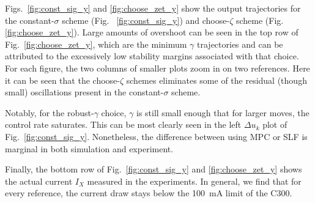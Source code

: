 \documentclass[twocolumn,twoside]{IEEEtran}
\begin{document}
Figs.~\ref{fig:const_sig_y} and \ref{fig:choose_zet_y} show the output trajectories for the constant-$\sigma$ scheme (Fig. ~\ref{fig:const_sig_y}) and choose-$\zeta$ scheme (Fig. \ref{fig:choose_zet_y}). Large amounts of overshoot can be seen in the top row of Fig.~\ref{fig:choose_zet_y}, which are the minimum $\gamma$ trajectories and can be attributed to the excessively low stability margins associated with that choice. For each figure, the two columns of smaller plots zoom in on two references. Here it can be seen that the choose-$\zeta$ schemes eliminates some of the residual (though small) oscillations present in the constant-$\sigma$ scheme.


Notably, for the robust-$\gamma$ choice, $\gamma$ is still small enough that for larger moves, the control rate saturates. This can be most clearly seen in the left $\Delta u_k$ plot of Fig.~\ref{fig:const_sig_y}. Nonetheless, the difference between using MPC or SLF is marginal in both simulation and experiment. 



Finally, the bottom row of Fig.~\ref{fig:const_sig_y} and \ref{fig:choose_zet_y}  shows the actual current $I_X$ measured in the experiments. In general, we find that for every reference, the current draw stays below the 100~mA limit of the C300. 
\end{document}

